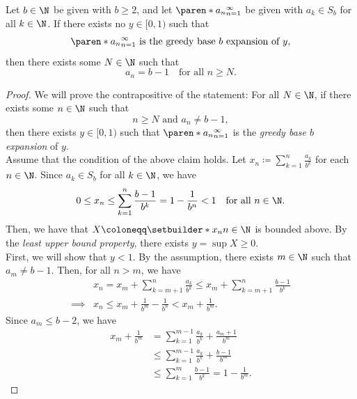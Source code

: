 \bigskip

\begin{theorem} \label{thm:NoRealNumberMatchingGreedyBaseExpansion}
    Let $b \in \N$ be given with $b \geq 2$, and let $\paren*{a_{n}}_{n = 1}^{\infty}$ be given with $a_{k} \in S_{b}$
    for all $k \in \N$. If there exists no $y \in [0, 1)$ such that
    \[
    \paren*{a_{n}}_{n = 1}^{\infty} \text{ is the greedy base $b$ expansion of $y$},
    \]
    then there exists some $N \in \N$ such that
    \[
    a_{n} = b - 1 \quad \text{for all } n \geq N.
    \]
\end{theorem}

\begin{proof}
    We will prove the contrapositive of the statement: For all $N \in \N$, if there exists some $n \in \N$ such that
    \[
    n \geq N \text{ and } a_{n} \neq b - 1,
    \]
    then there exists $y \in [0, 1)$ such that $\paren*{a_{n}}_{n = 1}^{\infty}$ is the \emph{greedy base $b$ expansion} of $y$.
    \\[6mm]
    Assume that the condition of the above claim holds. Let $x_{n} \coloneqq \displaystyle \sum_{k = 1}^{n}
    \frac{a_{k}}{b^{k}}$ for each $n \in \N$. Since $a_{k} \in S_{b}$ for all $k \in \N$, we have
    \[
    0 \leq x_{n} \leq \sum_{k = 1}^{n} \frac{b - 1}{b^{k}} = 1 - \frac{1}{b^{n}} < 1 \quad \text{for all } n \in \N.
    \]
    Then, we have that $X \coloneqq \setbuilder*{x_{n}}{n \in \N}$ is bounded above. By the
    \emph{least upper bound property}, there exists $y = \sup X \geq 0$.
    \\[6mm]
    First, we will show that $y < 1$. By the assumption, there exists $m \in \N$ such that $a_{m} \neq b - 1$.
    Then, for all $n > m$, we have
    \begin{align*}
        &x_{n} = x_{m} + \sum_{k = m + 1}^{n} \frac{a_{k}}{b^{k}} \leq x_{m} + \sum_{k = m + 1}^{n} \frac{b - 1}{b^{k}} \\
        \implies &x_{n} \leq x_{m} + \frac{1}{b^{m}} - \frac{1}{b^{n}} < x_{m} + \frac{1}{b^{m}}.
    \end{align*}
    Since $a_{m} \leq b - 2$, we have
    \begin{align*}
        x_{m} + \frac{1}{b^{m}} &= \sum_{k = 1}^{m - 1} \frac{a_{k}}{b^{k}} + \frac{a_{m} + 1}{b^{m}} \\
        &\leq \sum_{k = 1}^{m - 1} \frac{a_{k}}{b^{k}} + \frac{b - 1}{b^{m}} \\
        &\leq \sum_{k = 1}^{m} \frac{b - 1}{b^{k}} = 1 - \frac{1}{b^{m}}.
    \end{align*}

\end{proof}
